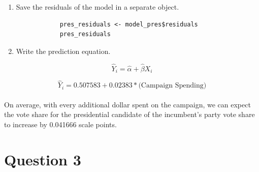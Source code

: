 \documentclass[12pt,letterpaper]{article}
\begin{document}
\begin{enumerate}
\begin{figure}[h!]
		\end{figure} 
				
		\newpage
		
		\item Save the residuals of the model in a separate object.	
		
		\begin{verbatim}
			pres_residuals <- model_pres$residuals
			pres_residuals
		\end{verbatim}
		
		
		\item Write the prediction equation.
		
		\end{enumerate}		
		
		{\large 			$$\hat{Y}_i = \hat{\alpha} +  \hat{\beta}X_i $$}
		
		
		{ 			$$\hat{Y}_i =  0.507583 +  0.02383 * \text{(Campaign Spending)} $$} \\
		
	
	\noindent On average, with every additional dollar spent on the campaign, we can expect the vote share for the presidential candidate of the incumbent's party vote share to increase by 0.041666 scale points.
		

	
	\newpage	
\section*{Question 3}
\end{document}
